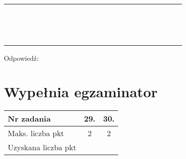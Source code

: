 \documentclass[10pt]{article}
\begin{document}
\begin{center}
\begin{tabular}{|c|c|c|c|c|c|c|c|c|c|c|c|c|c|c|c|c|c|c|c|c|c|c|}
\hline
 &  &  &  &  &  &  &  &  &  &  &  &  &  &  &  &  &  &  &  &  &  &  \\
\hline
 &  &  &  &  &  &  &  &  &  &  &  &  &  &  &  &  &  &  &  &  &  &  \\
\hline
 &  &  &  &  &  &  &  &  &  &  &  &  &  &  &  &  &  &  &  &  &  &  \\
\hline
 &  &  &  &  &  &  &  &  &  &  &  &  &  &  &  &  &  &  &  &  &  &  \\
\hline
 &  &  &  &  &  &  &  &  &  &  &  &  &  &  &  &  &  &  &  &  &  &  \\
\hline
 &  &  &  &  &  &  &  &  &  &  &  &  &  &  &  &  &  &  &  &  &  &  \\
\hline
 &  &  &  &  &  &  &  &  &  &  &  &  &  &  &  &  &  &  &  &  &  &  \\
\hline
 &  &  &  &  &  &  &  &  &  &  &  &  &  &  &  &  &  &  &  &  &  &  \\
\hline
 &  &  &  &  &  &  &  &  &  &  &  &  &  &  &  &  &  &  &  &  &  &  \\
\hline
 &  &  &  &  &  &  &  &  &  &  &  &  &  &  &  &  &  &  &  &  &  &  \\
\hline
 &  &  &  &  &  &  &  &  &  &  &  &  &  &  &  &  &  &  &  &  &  &  \\
\hline
 &  &  &  &  &  &  &  &  &  &  &  &  &  &  &  &  &  &  &  &  &  &  \\
\hline
 &  &  &  &  &  &  &  &  &  &  &  &  &  &  &  &  &  &  &  &  &  &  \\
\hline
 &  &  &  &  &  &  &  &  &  &  &  &  &  &  &  &  &  &  &  &  &  &  \\
\hline
 &  &  &  &  &  &  &  &  &  &  &  &  &  &  &  &  &  &  &  &  &  &  \\
\hline
\end{tabular}
\end{center}

Odpowiedź:

\section*{Wypełnia egzaminator}
\begin{center}
\begin{tabular}{|l|c|c|}
\hline
Nr zadania & 29. & 30. \\
\hline
Maks. liczba pkt & 2 & 2 \\
\hline
Uzyskana liczba pkt &  &  \\
\hline
\end{tabular}
\end{center}
\end{document}

